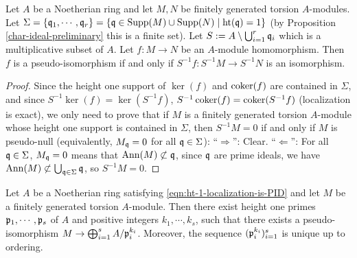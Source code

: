 \begin{lem}
\label{pis-iff}
\leanok
Let $A$ be a Noetherian ring and let
$M,N$ be finitely generated torsion $A$-modules.
Let $\Sigma=\{{\mathfrak{q}}_1,\cdots,{\mathfrak{q}}_r\}
=\{{\mathfrak{q}}\in{\mathrm{Supp}}(M)\cup{\mathrm{Supp}}(N)\mid{\mathrm{ht}}({\mathfrak{q}})=1\}$
(by Proposition \ref{char-ideal-preliminary} this is a finite set).
Let $S:=A\setminus\bigcup_{i=1}^r{\mathfrak{q}}_i$ which is a multiplicative subset of $A$.
Let $f:M\to N$ be an $A$-module homomorphism.
Then $f$ is a pseudo-isomorphism if and only if $S^{-1}f:S^{-1}M\to S^{-1}N$
is an isomorphism.
\end{lem}

\begin{proof}
Since the height one support of $\ker(f)$ and $\operatorname{coker}(f)$
are contained in $\Sigma$,
and since $S^{-1}\ker(f)=\ker(S^{-1}f)$,
$S^{-1}\operatorname{coker}(f)=\operatorname{coker}(S^{-1}f)$ (localization is exact),
we only need to prove that if $M$ is a finitely generated torsion $A$-module
whose height one support is contained in $\Sigma$,
then $S^{-1}M=0$ if and only if $M$ is pseudo-null (equivalently, $M_{\mathfrak{q}}=0$
for all ${\mathfrak{q}}\in\Sigma$):
``$\Rightarrow$'': Clear.
``$\Leftarrow$'': For all ${\mathfrak{q}}\in\Sigma$, $M_{\mathfrak{q}}=0$ means that ${\mathrm{Ann}}(M)\not\subset{\mathfrak{q}}$,
since ${\mathfrak{q}}$ are prime ideals, we have ${\mathrm{Ann}}(M)\not\subset\bigcup_{{\mathfrak{q}}\in\Sigma}{\mathfrak{q}}$,
so $S^{-1}M=0$.
\end{proof}

\begin{prop}
\label{structure-thm}
\leanok
Let $A$ be a Noetherian ring satisfying \eqref{eqn:ht-1-localization-is-PID}
and let $M$ be a finitely generated torsion $A$-module.
Then there exist height one primes ${\mathfrak{p}}_1,\cdots,{\mathfrak{p}}_s$ of $A$
and positive integers $k_1,\cdots,k_s$, such that there exists a pseudo-isomorphism
$M\to\bigoplus_{i=1}^s A/{\mathfrak{p}}_i^{k_i}$.
Moreover, the sequence $({\mathfrak{p}}_i^{k_i})_{i=1}^s$ is unique up to ordering.
\end{prop}

